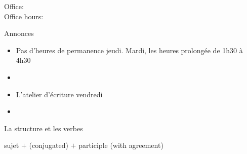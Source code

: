 \documentclass{beamer}
\subtitle[Passé composé (\lexi{être})]{Le passé composé avec \lexi{être} et plus d'aliments}
\begin{document}
  \begin{frame}
    \titlepage
    \tiny{Office: \\
          Office hours: }
  \end{frame}

  \begin{frame}{Annonces}
    \begin{itemize}
      \item Pas d'heures de permanence jeudi. Mardi, les heures prolongée de 1h30 à 4h30
      \item[] 
      \item L'atelier d'écriture vendredi
      \item[] 
    \end{itemize}
  \end{frame}

  \begin{frame}{La structure et les verbes}
    \begin{center}
      sujet $+$  (conjugated) $+$ participle (with agreement)
    \end{center}
  \end{frame}
\end{document}
